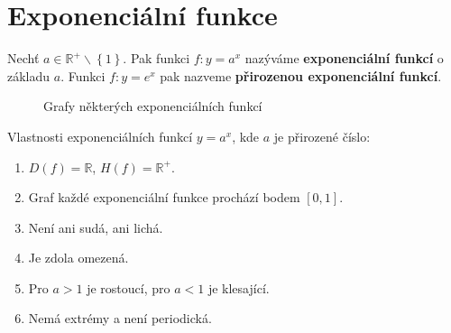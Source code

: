 \section{Exponenciální funkce}
\begin{definition}
    Nechť $a\in \mathbb R^+ \smallsetminus \left \{ 1 \right \}. $ Pak funkci $f:y=a^x$
    nazýváme \textbf{exponenciální funkcí} o základu $a$. Funkci $f:y=e^x$ pak
    nazveme \textbf{přirozenou exponenciální funkcí}.
\end{definition}

\begin{figure}[ht!]
  \centering
  \caption{Grafy některých exponenciálních funkcí}
\end{figure}

\begin{veta}
    Vlastnosti exponenciálních funkcí $y= a^x$, kde $a$ je přirozené číslo:
    \begin{enumerate}[$i.$]
        \item $D(f)= \mathbb R$, $H(f)= \mathbb R^+$.
       	\item Graf každé exponenciální funkce prochází bodem $[0,1].$
        \item Není ani sudá, ani lichá.
        \item Je zdola omezená.
        \item Pro $a >1$ je rostoucí, pro $a<1$ je klesající.
        \item Nemá extrémy a není periodická.
    \end{enumerate}
\end{veta}

